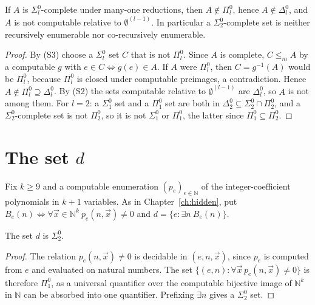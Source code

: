 \begin{lemma}
\label{lem:outside}
If $A$ is $\Sigma^0_l$-complete under many-one reductions, then $A\notin\Pi^0_l$, hence $A\notin\Delta^0_l$, and $A$ is not computable relative to $\emptyset^{(l-1)}$. In particular a $\Sigma^0_2$-complete set is neither recursively enumerable nor co-recursively enumerable.
\end{lemma}

\begin{proof}
By (S3) choose a $\Sigma^0_l$ set $C$ that is not $\Pi^0_l$. Since $A$ is complete, $C\le_m A$ by a computable $g$ with $e\in C\iff g(e)\in A$. If $A$ were $\Pi^0_l$, then $C=g^{-1}(A)$ would be $\Pi^0_l$, because $\Pi^0_l$ is closed under computable preimages, a contradiction. Hence $A\notin\Pi^0_l\supseteq\Delta^0_l$. By (S2) the sets computable relative to $\emptyset^{(l-1)}$ are $\Delta^0_l$, so $A$ is not among them. For $l=2$: a $\Sigma^0_1$ set and a $\Pi^0_1$ set are both in $\Delta^0_2\subseteq\Sigma^0_2\cap\Pi^0_2$, and a $\Sigma^0_2$-complete set is not $\Pi^0_2$, so it is not $\Sigma^0_1$ or $\Pi^0_1$, the latter since $\Pi^0_1\subseteq\Pi^0_2$.
\end{proof}

\section{The set $d$}

Fix $k\ge9$ and a computable enumeration $(p_e)_{e\in\mathbb{N}}$ of the integer-coefficient polynomials in $k+1$ variables. As in Chapter~\ref{ch:hidden}, put $B_e(n)\iff\forall\vec x\in\mathbb{N}^k\ p_e(n,\vec x)\neq0$ and $d=\{e:\exists n\ B_e(n)\}$.

\begin{proposition}
\label{prop:dsigma2}
The set $d$ is $\Sigma^0_2$.
\end{proposition}

\begin{proof}
The relation $p_e(n,\vec x)\neq0$ is decidable in $(e,n,\vec x)$, since $p_e$ is computed from $e$ and evaluated on natural numbers. The set $\{(e,n):\forall\vec x\,p_e(n,\vec x)\neq0\}$ is therefore $\Pi^0_1$, as a universal quantifier over the computable bijective image of $\mathbb{N}^k$ in $\mathbb{N}$ can be absorbed into one quantifier. Prefixing $\exists n$ gives a $\Sigma^0_2$ set.
\end{proof}

